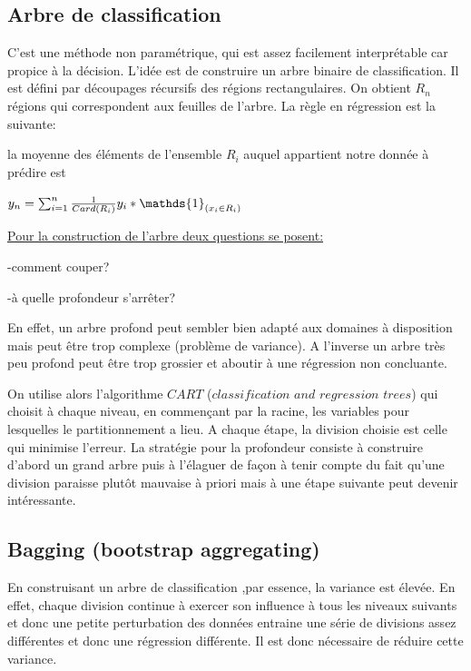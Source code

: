 \documentclass[a4paper,oneside,11pt]{article}
\begin{document}
\subsection*{Arbre de classification}
%

\qquad C'est une méthode non paramétrique, qui est assez facilement interprétable car propice à la décision.
L'idée est de construire un arbre binaire de classification. Il est défini par découpages récursifs des régions rectangulaires. On obtient $R_n$ régions qui correspondent aux feuilles de l'arbre. 
La règle en régression est la suivante: 

la moyenne des éléments de l'ensemble $R_i$ auquel appartient notre donnée à prédire est

$y_{n}=\sum_{i=1}^{n}\frac{1}{Card(R_{i})}y_{i}*\mathds{1}_{(x_{i} \in R_{i})} \newline$

\underline{Pour la construction de l'arbre deux questions se posent:}

-comment couper?

-à quelle profondeur s'arrêter?

\qquad En effet, un arbre profond peut sembler bien adapté aux domaines à disposition mais peut être trop complexe (problème de variance). A l'inverse un arbre très peu profond peut être trop grossier et aboutir 
à une régression non concluante.

\qquad On utilise alors l'algorithme $CART$ ($classification$ $and$ $regression$ $trees$) qui choisit à chaque niveau, en commençant par la racine, les variables pour lesquelles le partitionnement a lieu.
A chaque étape, la division choisie est celle qui minimise l'erreur. La stratégie pour la profondeur consiste à construire d'abord un grand arbre puis à l'élaguer de façon à tenir compte du fait qu'une division paraisse plutôt mauvaise à priori mais à une étape suivante peut devenir intéressante.

\subsection*{Bagging (bootstrap aggregating)}
%

\qquad En construisant un arbre de classification ,par essence, la variance est élevée. En effet, chaque division continue à exercer son influence à tous les niveaux suivants et donc une petite perturbation des données entraine une série de divisions assez différentes et donc une régression différente. Il est donc nécessaire de réduire cette variance.
\end{document}
